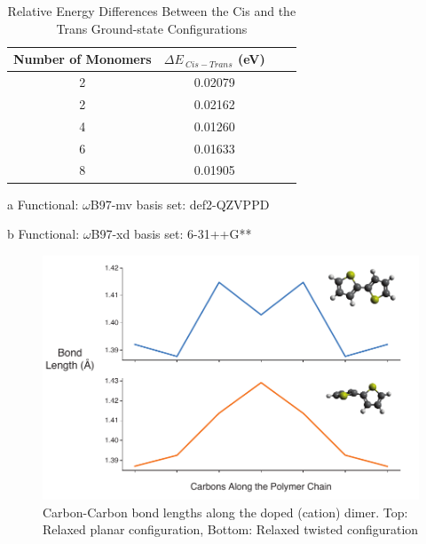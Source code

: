 \clearpage
\begin{table}[hbt!]\centering
\captionsetup{justification=centering}
\captionsetup{width=.6\textwidth}
\captionsetup{skip=2pt}
\caption{Relative Energy Differences Between the Cis and the Trans Ground-state Configurations}
\renewcommand{\arraystretch}{1.5}
\begin{threeparttable}
\begin{tabular}{cccc}\toprule
  {Number of Monomers} & {$\Delta E_{ \ Cis - Trans}$ (eV)} \\ \midrule
    2 & 0.02079\tnote{a}\\
    2 & 0.02162\tnote{b}\\
    4 & 0.01260\tnote{b}\\
    6 & 0.01633\tnote{b}\\
    8 & 0.01905\tnote{b}\\ \bottomrule
\end{tabular}
\begin{tablenotes}
\item[a] \footnotesize Functional: $\omega$B97-mv basis set: def2-QZVPPD
\item[b] \footnotesize Functional: $\omega$B97-xd basis set: 6-31++G**
\end{tablenotes}
\end{threeparttable}
\end{table}

\begin{figure}[hbt!]
    \centering
    \includegraphics{figures/append_tor_model/n2_fig_w.pdf}
    \caption{Carbon-Carbon bond lengths along the doped (cation) dimer. Top: Relaxed planar configuration, Bottom: Relaxed twisted configuration}
    \label{fig:n2_bl}
\end{figure}

